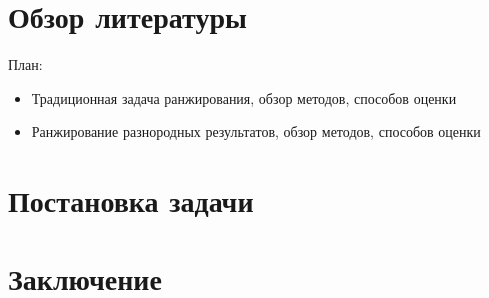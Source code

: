 \documentclass[12pt,a4paper]{report}
\begin{document}









\chapter{Обзор литературы}

План:

\begin{itemize}
  \item Традиционная задача ранжирования, обзор методов, способов оценки
  \item Ранжирование разнородных результатов, обзор методов, способов оценки
\end{itemize}


\chapter{Постановка задачи}

\chapter*{Заключение}
\end{document}
